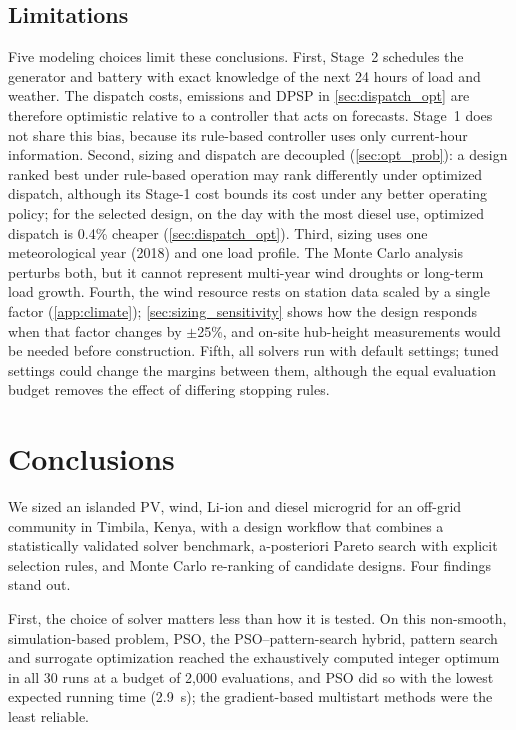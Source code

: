 \documentclass[final,3p,times]{elsarticle}
\begin{document}
\subsection{Limitations\label{sec:limitations}}
Five modeling choices limit these conclusions. First, Stage~2 schedules the generator and battery with exact knowledge of the next 24 hours of load and weather. The dispatch costs, emissions and DPSP in \cref{sec:dispatch_opt} are therefore optimistic relative to a controller that acts on forecasts. Stage~1 does not share this bias, because its rule-based controller uses only current-hour information. Second, sizing and dispatch are decoupled (\cref{sec:opt_prob}): a design ranked best under rule-based operation may rank differently under optimized dispatch, although its Stage-1 cost bounds its cost under any better operating policy; for the selected design, on the day with the most diesel use, optimized dispatch is 0.4\% cheaper (\cref{sec:dispatch_opt}). Third, sizing uses one meteorological year (2018) and one load profile. The Monte Carlo analysis perturbs both, but it cannot represent multi-year wind droughts or long-term load growth. Fourth, the wind resource rests on station data scaled by a single factor (\cref{app:climate}); \cref{sec:sizing_sensitivity} shows how the design responds when that factor changes by $\pm$25\%, and on-site hub-height measurements would be needed before construction. Fifth, all solvers run with default settings; tuned settings could change the margins between them, although the equal evaluation budget removes the effect of differing stopping rules.

\section{Conclusions}

We sized an islanded PV, wind, Li-ion and diesel microgrid for an off-grid community in Timbila, Kenya, with a design workflow that combines a statistically validated solver benchmark, a-posteriori Pareto search with explicit selection rules, and Monte Carlo re-ranking of candidate designs. Four findings stand out.

First, the choice of solver matters less than how it is tested. On this non-smooth, simulation-based problem, PSO, the PSO--pattern-search hybrid, pattern search and surrogate optimization reached the exhaustively computed integer optimum in all 30 runs at a budget of 2,000 evaluations, and PSO did so with the lowest expected running time (2.9~s); the gradient-based multistart methods were the least reliable.
\end{document}
